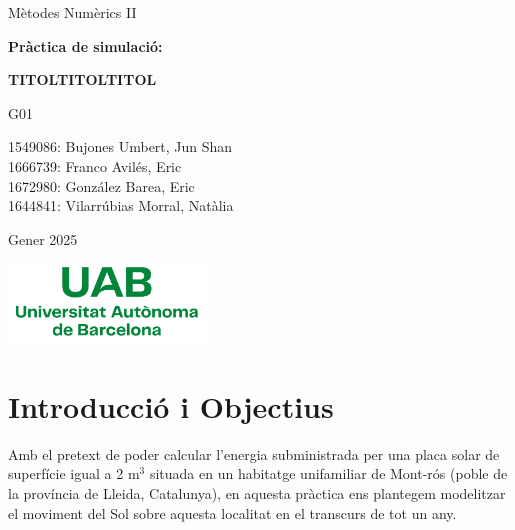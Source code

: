 \documentclass[10pt, twoside, a4paper]{article}
\begin{document}
\begin{titlepage}
\centering
{\LARGE Mètodes Numèrics II \par}
\vspace{2cm}
{\Huge \textbf{Pràctica de simulació:} \par}
\vspace{1cm}
{\Huge \textbf{TITOLTITOLTITOL} \par}
\vspace{3cm}
{\Large G01 \par}
\vspace{0.5cm}
{\Large 1549086: Bujones Umbert, Jun Shan\\1666739: Franco Avilés, Eric\\  1672980: González Barea, Eric\\1644841: Vilarrúbias Morral, Natàlia \par}
\vspace{2cm}
{\Large Gener 2025 \par}
\vspace{2cm}
\includegraphics[width=0.4\textwidth]{Logo_UAB.png}


\end{titlepage}

\renewcommand{\cftsecfont}{}
\renewcommand{\cftsecpagefont}{}
\renewcommand{\cftsecleader}{\cftdotfill{\cftdotsep}}
\renewcommand{\cftdotsep}{0.2}
\setlength{\cftbeforesecskip}{0.5em}
\setlength{\cftbeforesubsecskip}{0.5em}
\tableofcontents

\newpage
{}
\setcounter{page}{1}

\pagestyle{fancy}

\section{Introducció i Objectius}
Amb el pretext de poder calcular l'energia subministrada per una placa solar de superfície igual a 2 m$^3$ situada en un habitatge unifamiliar de Mont-rós (poble de la província de Lleida, Catalunya), en aquesta pràctica ens plantegem modelitzar el moviment del Sol sobre aquesta localitat en el transcurs de tot un any. 
\end{document}
